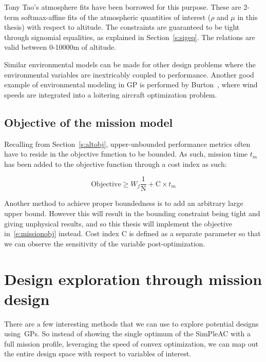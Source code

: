 Tony Tao's atmosphere fits have been borrowed for this purpose. These are
2-term softmax-affine fits of the atmospheric
quantities of interest ($\rho$ and $\mu$ in this thesis) with respect to altitude. The constraints
are guaranteed to be tight through signomial equalities, as explained in Section~\ref{s:sigeq}.
The relations are valid between 0-10000m of altitude.

Similar environmental models can be made for other design problems where the environmental
variables are inextricably coupled to performance. Another good example of environmental modeling
in \gls{GP} is performed by Burton~\cite{gassolar}, where wind speeds are integrated into
a loitering aircraft optimization problem.

\subsection{Objective of the mission model}
\label{s:missionobj}

Recalling from Section~\ref{s:altobj}, upper-unbounded performance metrics often have to
reside in the objective function to be bounded. As such, mission time $t_m$ has been added
to the objective function through a cost index as such:

\begin{equation}
    \mathrm{Objective} \geq W_f \frac{1}{\mathrm{N}} + \mathrm{C} \times t_m
    \label{e:missionobj}
\end{equation}

Another method to achieve proper boundedness is to add an arbitrary large upper bound. However
this will result in the bounding constraint being tight and giving unphysical results, and so
this thesis will implement the objective in~\ref{e:missionobj} instead.
Cost index $\mathrm{C}$ is defined as a separate parameter so that we can observe the sensitivity
of the variable post-optimization.

\section{Design exploration through mission design}

There are a few interesting methods that we can use to explore
potential designs using~\gls{GP}s. So instead of showing the single optimum of the
SimPleAC with a full mission profile, leveraging the speed of convex optimization,
we can map out the entire design space with respect to variables of interest.

